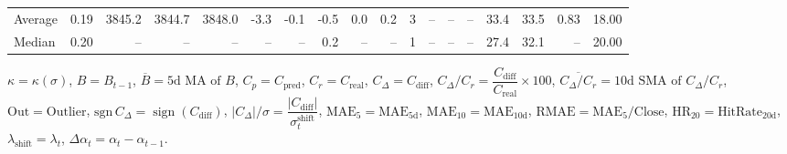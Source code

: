 \begin{threeparttable}
{\begin{tabular}{lrrrrrrrrrrrrrrrrr}
Average &     0.19 & 3845.2 & 3844.7 & 3848.0 &       -3.3 &           -0.1 &                      -0.5 &                      0.0 &                 0.2 &              3 &         -- &        -- &             -- &             33.4 &                33.5 &            0.83 &                  18.00 \\
 Median &     0.20 &     -- &     -- &     -- &         -- &             -- &                       0.2 &                       -- &                  -- &              1 &         -- &        -- &             -- &             27.4 &                32.1 &              -- &                  20.00 \\
\bottomrule
\end{tabular}
}
\begin{tablenotes}\footnotesize
\item $\kappa=\kappa(\sigma)$, $B=B_{t-1}$, $\overline{B}=\text{5d MA of }B$, $C_p=C_{\text{pred}}$, $C_r=C_{\text{real}}$, $C_\Delta=C_{\text{diff}}$, $C_\Delta/C_r=\dfrac{C_{\text{diff}}}{C_{\text{real}}}\times100$, $\overline{C_\Delta/C_r}=\text{10d SMA of }C_\Delta/C_r$, $\mathrm{Out}=\text{Outlier}$, $\mathrm{sgn}\,C_\Delta=\operatorname{sign}(C_{\text{diff}})$, $|C_\Delta|/\sigma=\dfrac{|C_{\text{diff}}|}{\sigma_t^{\text{shift}}}$, $\mathrm{MAE}_5=\mathrm{MAE}_{5\text{d}}$, $\mathrm{MAE}_{10}=\mathrm{MAE}_{10\text{d}}$, $\mathrm{RMAE}= \mathrm{MAE}_5 / \text{Close}$, $\mathrm{HR}_{20}=\mathrm{HitRate}_{20\text{d}}$, $\lambda_{\text{shift}}=\lambda_t$, $\Delta\alpha_t=\alpha_t-\alpha_{t-1}$.
\end{tablenotes}
\end{threeparttable}
\endgroup

